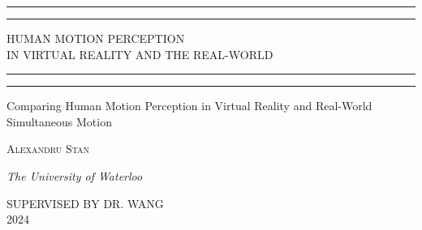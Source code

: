 \documentclass[a4paper, 11pt, oneside]{book}
\begin{document}
 

    \begin{titlepage} 

        \centering 
        
        \scshape 
        
        \vspace*{\baselineskip} 
        
        
        \rule{\textwidth}{1.6pt}\vspace*{-\baselineskip}\vspace*{2pt} %
        \rule{\textwidth}{0.4pt} %
        
        \vspace{0.75\baselineskip} 
        
        {\LARGE HUMAN MOTION PERCEPTION \\ IN VIRTUAL REALITY AND THE REAL-WORLD} 
        
        \vspace{0.75\baselineskip} 
        
        \rule{\textwidth}{0.4pt}\vspace*{-\baselineskip}\vspace{3.2pt} 
        \rule{\textwidth}{1.6pt} 
        
        \vspace{2\baselineskip}
        
        
        Comparing Human Motion Perception in Virtual Reality 
        and Real-World Simultaneous Motion
        
        \vspace*{3\baselineskip}
        
        \vspace{0.5\baselineskip} 
        
        {\scshape\Large Alexandru Stan } 
        
        \vspace{0.5\baselineskip} 
        
        \textit{The University of Waterloo} 
        
        \vfill 

        SUPERVISED BY DR. WANG\\
        2024 %

    \end{titlepage}
\end{document}
